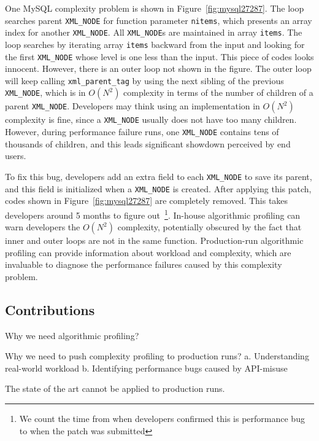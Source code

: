 One MySQL complexity problem is shown in Figure~\ref{fig:mysql27287}.
The loop searches parent \texttt{XML\_NODE} for function parameter \texttt{nitems}, 
which presents an array index for another \texttt{XML\_NODE}.
All \texttt{XML\_NODE}s are maintained in array \texttt{items}. 
The loop searches by iterating array \texttt{items} 
backward from the input and looking for the first \texttt{XML\_NODE} 
whose level is one less than the input.
This piece of codes looks innocent. 
However, there is an outer loop not shown in the figure.
The outer loop will keep calling \texttt{xml\_parent\_tag} by using 
the next sibling of the previous \texttt{XML\_NODE}, 
which is in $O(N^2)$ complexity in terms of the number of children of a parent \texttt{XML\_NODE}. 
Developers may think using an implementation in $O(N^2)$ complexity is fine, 
since a \texttt{XML\_NODE} usually does not have too many children.
However, during performance failure runs, 
one \texttt{XML\_NODE} contains tens of thousands of children, 
and this leads significant showdown perceived by end users. 

To fix this bug, developers add an extra field to each \texttt{XML\_NODE} to save its parent, 
and this field is initialized when a \texttt{XML\_NODE} is created. 
After applying this patch, codes shown in Figure~\ref{fig:mysql27287} are completely removed.
This takes developers around 5 months to figure 
out~\footnote{We count the time from when developers confirmed this is performance bug 
to when the patch was submitted}. 
In-house algorithmic profiling can warn developers the $O(N^2)$ complexity, 
potentially obscured by the fact that inner and outer loops are not in the same function. 
Production-run algorithmic profiling can provide information about workload and complexity,
which are invaluable to diagnose the performance failures caused by this complexity problem. 




\subsection{Contributions}
\label{sec:con}


Why we need algorithmic profiling? 

Why we need to push complexity profiling to production runs? 
a. Understanding real-world workload
b. Identifying performance bugs caused by API-misuse

The state of the art cannot be applied to production runs. 

